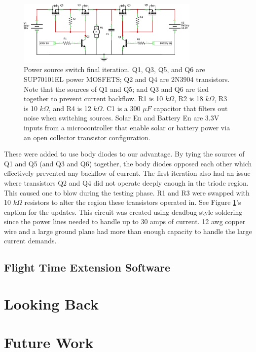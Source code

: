 \documentclass[12pt,journal,compsoc]{IEEEtran}
\begin{document}
\begin{figure}[h!]
\hspace*{0cm}
\centering
\includegraphics[width=3.5in]{solar_circuit3_schem.png}
\caption{Power source switch final iteration. Q1, Q3, Q5, and Q6 are SUP70101EL power MOSFETS; Q2 and Q4 are 2N3904 transistors. Note that the sources of Q1 and Q5; and Q3 and Q6 are tied together to prevent current backflow. R1 is 10 $k\Omega$, R2 is 18 $k\Omega$, R3 is 10 $k\Omega$, and R4 is 12 $k\Omega$. C1 is a 300 $\mu F$ capacitor that filters out noise when switching sources. Solar En and Battery En are 3.3V inputs from a microcontroller that enable solar or battery power via an open collector transistor configuration.}
\label{solSchem2}
\end{figure}
These were added to use body diodes to our advantage. By tying the sources of Q1 and Q5 (and Q3 and Q6) together, the body diodes opposed each other which effectively prevented any backflow of current. The first iteration also had an issue where transistors Q2 and Q4 did not operate deeply enough in the triode region. This caused one to blow during the testing phase. R1 and R3 were swapped with 10 $k\Omega$ resistors to alter the region these transistors operated in. See Figure \ref{solSchem2}'s caption for the updates. This circuit was created using deadbug style soldering since the power lines needed to handle up to 30 amps of current. 12 awg copper wire and a large ground plane had more than enough capacity to handle the large current demands.

\subsection{Flight Time Extension Software}

\section{Looking Back}
\section{Future Work}
\end{document}
